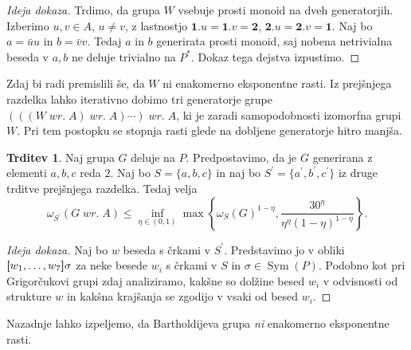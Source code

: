 \documentclass[11pt]{book}
\renewcommand{\wreath}{\; wr. \;}
\def\one{\mathbf{1}}
\def\two{\mathbf{2}}
\DeclareMathOperator\Sym{Sym}
\theoremstyle{definition}
\theoremstyle{zgled}
\theoremstyle{odprtproblem}
\theoremstyle{domacanaloga}
\newenvironment{dokaz}
    {\color{siva}\begin{proof}}
    {\end{proof}}
\theoremstyle{izrek}
\newtheorem*{trditev}{Trditev}
\begin{document}
\begin{dokaz}[Ideja dokaza]
Trdimo, da grupa $W$ vsebuje prosti monoid na dveh generatorjih.
Izberimo $u,v \in A$, $u \neq v$, z lastnostjo $\one.u = \one.v = \two$, $\two.u = \two.v = \one$. Naj bo $a = \bar u u$ in $b = \bar v v$. Tedaj $a$ in $b$ generirata prosti monoid, saj nobena netrivialna beseda v $a,b$ ne deluje trivialno na $P^*$. Dokaz tega dejstva izpustimo.
\end{dokaz}

Zdaj bi radi premislili še, da $W$ ni enakomerno eksponentne rasti. Iz prejšnjega razdelka lahko iterativno dobimo tri generatorje grupe $(((W \wreath A) \wreath A ) \cdots ) \wreath A$, ki je zaradi samopodobnosti izomorfna grupi $W$. Pri tem postopku se stopnja rasti glede na dobljene generatorje hitro manjša.

\begin{trditev}
Naj grupa $G$ deluje na $P$. Predpostavimo, da je $G$ generirana z elementi $a,b,c$ reda $2$. Naj bo $S = \{ a,b,c \}$ in naj bo $S^\prime = \{ a^\prime, b^\prime, c^\prime \}$ iz druge trditve prejšnjega razdelka. Tedaj velja
\[
\omega_{S^\prime}(G \wreath A) \leq \inf_{\eta \in (0,1)} \max \left\{ \omega_S(G)^{1-\eta}, \frac{30^\eta}{\eta^\eta (1-\eta)^{1-\eta}} \right\}.
\]\vspace{-\baselineskip}
\end{trditev}

\begin{dokaz}[Ideja dokaza]
Naj bo $w$ beseda s črkami v $S^\prime$. Predstavimo jo v obliki ${\textbf [} w_1, \dots, w_7 {\textbf ]} \sigma$ za neke besede $w_i$ s črkami v $S$ in $\sigma \in \Sym(P)$. Podobno kot pri Grigorčukovi grupi zdaj analiziramo, kakšne so dolžine besed $w_i$ v odvisnosti od strukture $w$ in kakšna krajšanja se zgodijo v vsaki od besed $w_i$.
\end{dokaz}

Nazadnje lahko izpeljemo, da Bartholdijeva grupa {\em ni} enakomerno eksponentne rasti.
\end{document}
